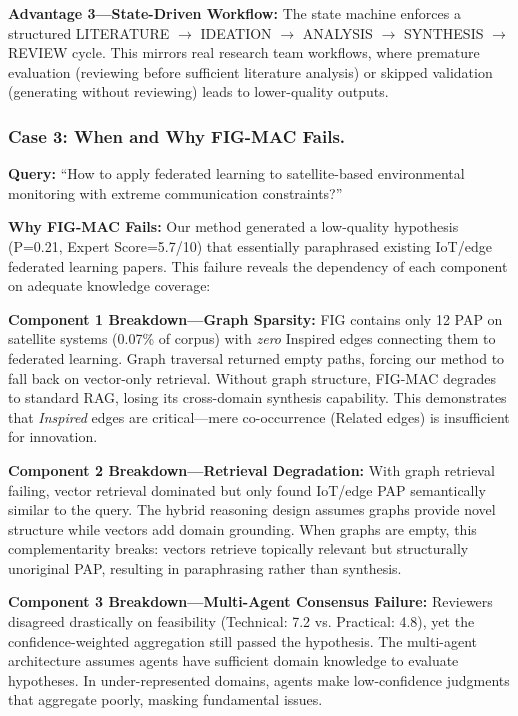 \documentclass[runningheads]{llncs}
\begin{document}
\textbf{Advantage 3---State-Driven Workflow:} The state machine enforces a structured LITERATURE $\rightarrow$ IDEATION $\rightarrow$ ANALYSIS $\rightarrow$ SYNTHESIS $\rightarrow$ REVIEW cycle. This mirrors real research team workflows, where premature evaluation (reviewing before sufficient literature analysis) or skipped validation (generating without reviewing) leads to lower-quality outputs.

\subsubsection{Case 3: When and Why FIG-MAC Fails.}
\label{sec:case3}

\textbf{Query:} ``How to apply federated learning to satellite-based environmental monitoring with extreme communication constraints?''

\textbf{Why FIG-MAC Fails:} Our method generated a low-quality hypothesis (P=0.21, Expert Score=5.7/10) that essentially paraphrased existing IoT/edge federated learning papers. This failure reveals the dependency of each component on adequate knowledge coverage:

\textbf{Component 1 Breakdown---Graph Sparsity:} FIG contains only 12 PAP on satellite systems (0.07\% of corpus) with \emph{zero} Inspired edges connecting them to federated learning. Graph traversal returned empty paths, forcing our method to fall back on vector-only retrieval. Without graph structure, FIG-MAC degrades to standard RAG, losing its cross-domain synthesis capability. This demonstrates that \emph{Inspired} edges are critical---mere co-occurrence (Related edges) is insufficient for innovation.

\textbf{Component 2 Breakdown---Retrieval Degradation:} With graph retrieval failing, vector retrieval dominated but only found IoT/edge PAP semantically similar to the query. The hybrid reasoning design assumes graphs provide novel structure while vectors add domain grounding. When graphs are empty, this complementarity breaks: vectors retrieve topically relevant but structurally unoriginal PAP, resulting in paraphrasing rather than synthesis.

\textbf{Component 3 Breakdown---Multi-Agent Consensus Failure:} Reviewers disagreed drastically on feasibility (Technical: 7.2 vs. Practical: 4.8), yet the confidence-weighted aggregation still passed the hypothesis. The multi-agent architecture assumes agents have sufficient domain knowledge to evaluate hypotheses. In under-represented domains, agents make low-confidence judgments that aggregate poorly, masking fundamental issues.
\end{document}
